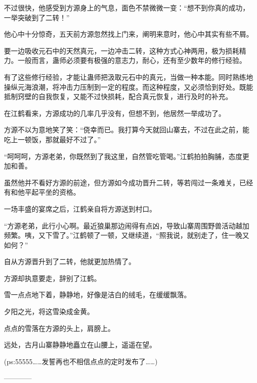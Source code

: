 \begin{this_body}
不过很快，他感受到方源身上的气息，面色不禁微微一变：“想不到你真的成功，一举突破到了二转！”

他心中十分惊奇，五天前方源忽然找上门来，阐明来意时，他心中其实有些不屑。

要一边吸收元石中的天然真元，一边冲击二转，这种方式心神两用，极为损耗精力。一般而言，蛊师必须要有极强的意志力，耐心，还有至少数年的修行经验。

有了这些修行经验，才能让蛊师把汲取元石中的真元，当做一种本能。同时熟练地操纵元海浪潮，将冲击力压制到一定的程度。而这种程度，又必须恰到好处。既能抵制窍壁的自我恢复，又能不过快损耗，配合真元恢复，进行及时的补充。

在江鹤看来，方源成功的几率几乎没有，但想不到，他居然一举成功了。

方源不以为意地笑了笑：“侥幸而已。我打算今天就回山寨去，不过在此之前，能吃上一顿饭，那就最好不过了。”

“呵呵呵，方源老弟，你既然到了我这里，自然管吃管喝。”江鹤拍拍胸脯，态度更加和善。

虽然他并不看好方源的前途，但方源如今成功晋升二转，等若闯过一条难关，已经有和他平起平坐的资格。

一场丰盛的宴席之后，江鹤亲自将方源送到村口。

“方源老弟，此行小心啊。最近狼巢那边闹得有点凶，导致山寨周围野兽活动越加频繁。咦，又下雪了。”江鹤顿了一顿，又继续道，“照我说，就别走了，住一晚又如何？”

自从方源晋升到了二转，他就更加热情了。

方源却执意要走，辞别了江鹤。

雪一点点地下着，静静地，好像是洁白的绒毛，在缓缓飘落。

夕阳之光，将这雪染成金黄。

点点的雪落在方源的头上，肩膀上。

远处，古月山寨静静地矗立在山腰上，遥遥在望。

(ps:55555……发誓再也不相信点点的定时发布了……)

------------

\end{this_body}

